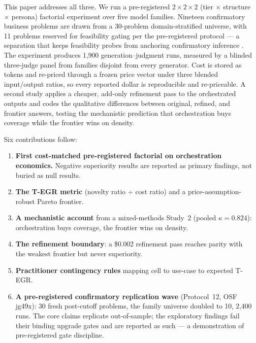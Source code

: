 \documentclass[12pt,a4paper]{article}
\begin{document}
This paper addresses all three. We run a pre-registered $2 \times 2 \times 2$
(tier $\times$ structure $\times$ persona) factorial experiment over five model
families. Nineteen confirmatory business problems are drawn from a 30-problem
domain-stratified universe, with 11 problems reserved for feasibility gating per
the pre-registered protocol --- a separation that keeps feasibility probes from
anchoring confirmatory inference \citep{AlbersLakens2018}. The experiment
produces 1{,}900 generation--judgment runs, measured by a blinded three-judge
panel from families disjoint from every generator. Cost is stored as tokens and re-priced
through a frozen price vector under three blended input/output ratios, so every
reported dollar is reproducible and re-priceable. A second study applies a
cheaper, add-only refinement pass to the orchestrated outputs and codes the
qualitative differences between original, refined, and frontier answers,
testing the mechanistic prediction that orchestration buys coverage while the
frontier wins on density.

Six contributions follow:
\begin{enumerate}[leftmargin=*,nosep]
  \item \textbf{First cost-matched pre-registered factorial on orchestration
        economics.} Negative superiority results are reported as primary
        findings, not buried as null results.
  \item \textbf{The T-EGR metric} (novelty ratio $\div$ cost ratio) and a
        price-assumption-robust Pareto frontier.
  \item \textbf{A mechanistic account} from a mixed-methods Study~2 (pooled
        $\kappa = 0.824$): orchestration buys coverage, the frontier wins on
        density.
  \item \textbf{The refinement boundary}: a \$0.002 refinement pass reaches
        parity with the weakest frontier but never superiority.
  \item \textbf{Practitioner contingency rules} mapping cell to use-case to
        expected T-EGR.
  \item \textbf{A pre-registered confirmatory replication wave} (Protocol~12,
        OSF jg49x): 30 fresh post-cutoff problems, the family universe doubled
        to 10, 2{,}400 runs. The core claims replicate out-of-sample; the
        exploratory findings fail their binding upgrade gates and are reported
        as such --- a demonstration of pre-registered gate discipline.
\end{enumerate}
\end{document}
